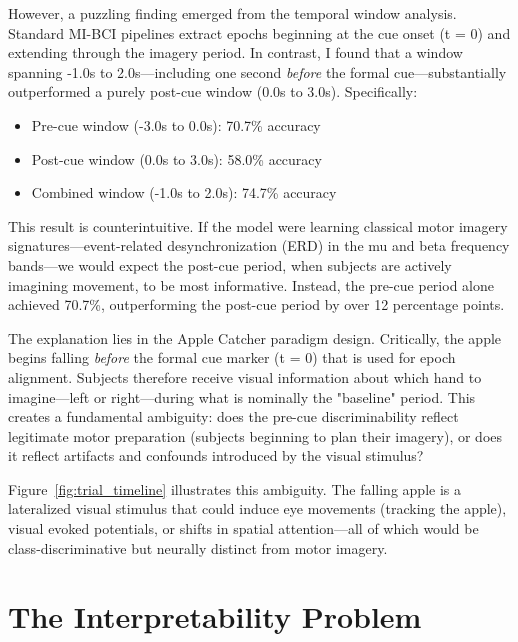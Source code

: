 However, a puzzling finding emerged from the temporal window analysis. Standard MI-BCI pipelines extract epochs beginning at the cue onset (t = 0) and extending through the imagery period. In contrast, I found that a window spanning -1.0s to 2.0s—including one second \textit{before} the formal cue—substantially outperformed a purely post-cue window (0.0s to 3.0s). Specifically:

\begin{itemize}
    \item Pre-cue window (-3.0s to 0.0s): 70.7\% accuracy
    \item Post-cue window (0.0s to 3.0s): 58.0\% accuracy
    \item Combined window (-1.0s to 2.0s): 74.7\% accuracy
\end{itemize}

This result is counterintuitive. If the model were learning classical motor imagery signatures—event-related desynchronization (ERD) in the mu and beta frequency bands—we would expect the post-cue period, when subjects are actively imagining movement, to be most informative. Instead, the pre-cue period alone achieved 70.7\%, outperforming the post-cue period by over 12 percentage points.

The explanation lies in the Apple Catcher paradigm design. Critically, the apple begins falling \textit{before} the formal cue marker (t = 0) that is used for epoch alignment. Subjects therefore receive visual information about which hand to imagine—left or right—during what is nominally the "baseline" period. This creates a fundamental ambiguity: does the pre-cue discriminability reflect legitimate motor preparation (subjects beginning to plan their imagery), or does it reflect artifacts and confounds introduced by the visual stimulus?

Figure~\ref{fig:trial_timeline} illustrates this ambiguity. The falling apple is a lateralized visual stimulus that could induce eye movements (tracking the apple), visual evoked potentials, or shifts in spatial attention—all of which would be class-discriminative but neurally distinct from motor imagery.



\section{The Interpretability Problem}
\label{sec:intro_interpretability_problem}

